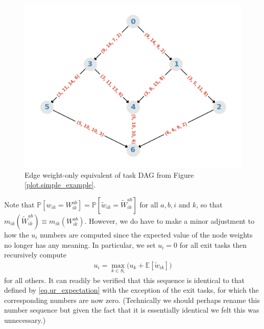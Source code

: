\documentclass[12pt]{article}
\def\P{\mathbb{P}}
\def\E{\mathbb{E}}
\begin{document}
\begin{figure}
	\centering	
	\includegraphics[scale=0.8]{simple_graph_edge_only.png}
	\caption{Edge weight-only equivalent of task DAG from Figure \ref{plot.simple_example}.}	
	\label{plot.example_edge_only}
\end{figure} 


Note that $\P[w_{ik} = W_{ik}^{ab}] = \P[\tilde{w}_{ik} = \tilde{W}_{ik}^{ab}]$ for all $a, b, i$ and $k$, so that $m_{ik}(\tilde{W}_{ik}^{ab}) \equiv m_{ik}(W_{ik}^{ab})$. However, we do have to make a minor adjustment to how the $u_i$ numbers are computed since the expected value of the node weights no longer has any meaning. In particular, we set $u_i = 0$ for all exit tasks then recursively compute       
\begin{align}
u_i = \max_{k \in S_i} \big( u_k + \E[\tilde{w}_{ik}] \big) \label{eq.ur_edge_only}
\end{align}
for all others. It can readily be verified that this sequence is identical to that defined by \eqref{eq.ur_expectation} with the exception of the exit tasks, for which the corresponding numbers are now zero. (Technically we should perhaps rename this number sequence but given the fact that it is essentially identical we felt this was unnecessary.) 
\end{document}
